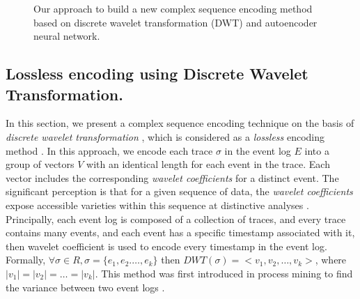 \begin{figure}[htb]
	\begin{center}
		\caption[Wavelet complex Sequence encoding]{Our approach to build a new complex sequence encoding method based on discrete wavelet transformation (DWT) and autoencoder neural network.}
		\label{fig:dwt1}
	\end{center}
\end{figure}


\subsection{Lossless encoding using Discrete Wavelet Transformation.}

In this section, we present a complex sequence encoding technique on the basis of \textit{discrete wavelet transformation} \cite{weeks2003discrete}, which is considered as a \textit{lossless} encoding method \cite{taymouri2019business}. In this approach, we encode each trace $\sigma$ in the event log $E$ into a group of vectors $V$ with an identical length for each event in the trace. Each vector includes the corresponding \textit{wavelet coefficients} for a distinct event. The significant perception is that for a given sequence of data, the \textit{wavelet coefficients} expose accessible varieties within this sequence at distinctive analyses \cite{taymouri2019business}.  Principally, each event log is composed of a collection of traces, and every trace contains many events, and each event has a specific timestamp associated with it, then wavelet coefficient is used to encode every timestamp in the event log. Formally, $\forall \sigma \in R, \sigma = \{e_1, e_2. \dots, e_k\}$ then $DWT(\sigma) = <v_1, v_2, \dots, v_k>$, where $|v_1| = |v_2| = \dots = |v_k|$. This method was first introduced in process mining to find the variance between two event logs \cite{taymouri2019business}.


